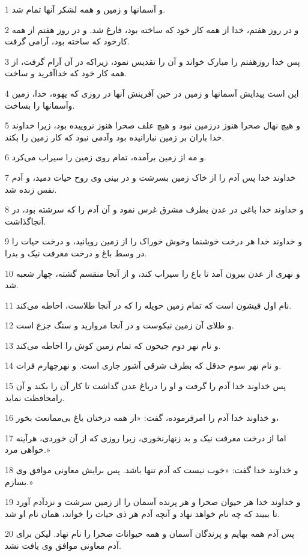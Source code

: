 \par 1 و آسمانها و زمین و همه لشکر آنها تمام شد.
\par 2 و در روز هفتم، خدا از همه کار خود که ساخته بود، فارغ شد. و در روز هفتم از همه کارخود که ساخته بود، آرامی گرفت.
\par 3 پس خدا روزهفتم را مبارک خواند و آن را تقدیس نمود، زیراکه در آن آرام گرفت، از همه کار خود که خداآفرید و ساخت.
\par 4 این است پیدایش آسمانها و زمین در حین آفرینش آنها در روزی که یهوه، خدا، زمین وآسمانها را بساخت.
\par 5 و هیچ نهال صحرا هنوز درزمین نبود و هیچ علف صحرا هنوز نروییده بود، زیرا خداوند خدا باران بر زمین نبارانیده بود وآدمی نبود که کار زمین را بکند.
\par 6 و مه از زمین برآمده، تمام روی زمین را سیراب می‌کرد.
\par 7 خداوند خدا پس آدم را از خاک زمین بسرشت و در بینی وی روح حیات دمید، و آدم نفس زنده شد.
\par 8 و خداوند خدا باغی در عدن بطرف مشرق غرس نمود و آن آدم را که سرشته بود، در آنجاگذاشت.
\par 9 و خداوند خدا هر درخت خوشنما وخوش خوراک را از زمین رویانید، و درخت حیات را در وسط باغ و درخت معرفت نیک و بدرا.
\par 10 و نهری از عدن بیرون آمد تا باغ را سیراب کند، و از آنجا منقسم گشته، چهار شعبه شد.
\par 11 نام اول فیشون است که تمام زمین حویله را که در آنجا طلاست، احاطه می‌کند.
\par 12 و طلای آن زمین نیکوست و در آنجا مروارید و سنگ جزع است.
\par 13 و نام نهر دوم جیحون که تمام زمین کوش را احاطه می‌کند.
\par 14 و نام نهر سوم حدقل که بطرف شرقی آشور جاری است. و نهر‌چهارم فرات.
\par 15 پس خداوند خدا آدم را گرفت و او را درباغ عدن گذاشت تا کار آن را بکند و آن رامحافظت نماید.
\par 16 و خداوند خدا آدم را امرفرموده، گفت: «از همه درختان باغ بی‌ممانعت بخور،
\par 17 اما از درخت معرفت نیک و بد زنهارنخوری، زیرا روزی که از آن خوردی، هرآینه خواهی مرد.»
\par 18 و خداوند خدا گفت: «خوب نیست که آدم تنها باشد. پس برایش معاونی موافق وی بسازم.»
\par 19 و خداوند خدا هر حیوان صحرا و هر پرنده آسمان را از زمین سرشت و نزدآدم آورد تا ببیند که چه نام خواهد نهاد و آنچه آدم هر ذی حیات را خواند، همان نام او شد.
\par 20 پس آدم همه بهایم و پرندگان آسمان و همه حیوانات صحرا را نام نهاد. لیکن برای آدم معاونی موافق وی یافت نشد.
